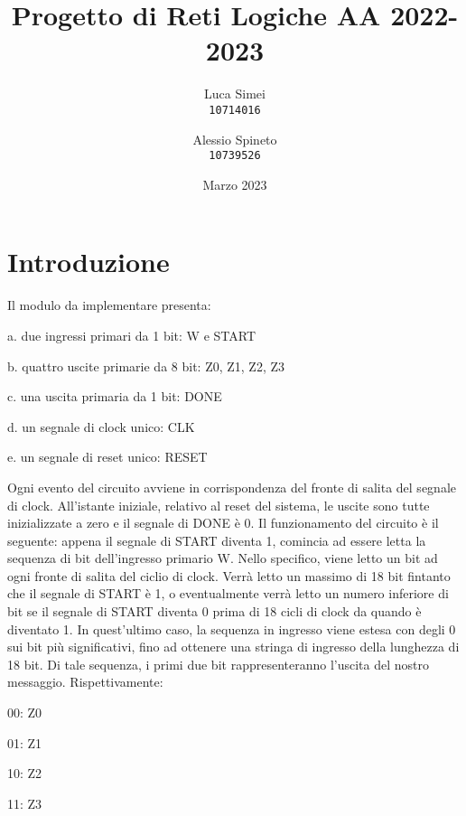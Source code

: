 \documentclass{article}
\title{Progetto di Reti Logiche AA 2022-2023}
\author{Luca Simei\\
\texttt{10714016}
\and
Alessio Spineto\\
\texttt{10739526}
}
\date{Marzo 2023}
\begin{document}
\maketitle

\section{Introduzione}
Il modulo da implementare presenta:

a. due ingressi primari da 1 bit: W e START

b. quattro uscite primarie da 8 bit: Z0, Z1, Z2, Z3

c. una uscita primaria da 1 bit: DONE

d. un segnale di clock unico: CLK

e. un segnale di reset unico: RESET

\noindent Ogni evento del circuito avviene in corrispondenza del fronte di salita del segnale di clock. All'istante iniziale, relativo al reset del sistema, le uscite sono tutte inizializzate a zero e il segnale di DONE è 0. Il funzionamento del circuito è il seguente: appena il segnale di START diventa 1, comincia ad essere letta la sequenza di bit dell'ingresso primario W. Nello specifico, viene letto un bit ad ogni fronte di salita del ciclio di clock. Verrà letto un massimo di 18 bit fintanto che il segnale di START è 1, o eventualmente verrà letto un numero inferiore di bit se il segnale di START diventa 0 prima di 18 cicli di clock da quando è diventato 1. In quest'ultimo caso, la sequenza in ingresso viene estesa con degli 0 sui bit più significativi, fino ad ottenere una stringa di ingresso della lunghezza di 18 bit. Di tale sequenza, i primi due bit rappresenteranno l'uscita del nostro messaggio. Rispettivamente:

00: Z0

01: Z1

10: Z2

11: Z3
\end{document}
